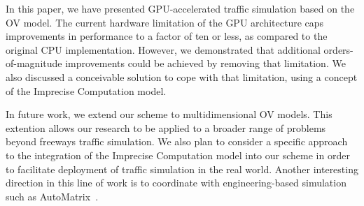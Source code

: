 \documentclass[times, 10pt, twocolumn]{article}
\begin{document}
In this paper, we have presented GPU-accelerated traffic simulation
based on the OV model.
The current hardware limitation of the GPU architecture caps
improvements in performance to a factor of ten or less, as compared to
the original CPU implementation.
However, we demonstrated that additional orders-of-magnitude
improvements could be achieved by removing that limitation.
We also discussed a conceivable solution to cope with that limitation,
using a concept of the Imprecise Computation model.

In future work, we extend our scheme to multidimensional OV models.
This extention allows our research to be applied to a broader range of
problems beyond freeways traffic simulation.
We also plan to consider a specific approach to the integration of the
Imprecise Computation model into our scheme in order to facilitate
deployment of traffic simulation in the real world.
Another interesting direction in this line of work is to coordinate with
engineering-based simulation such as AutoMatrix~\cite{Mangharam2011}.


{\footnotesize

}
\end{document}
